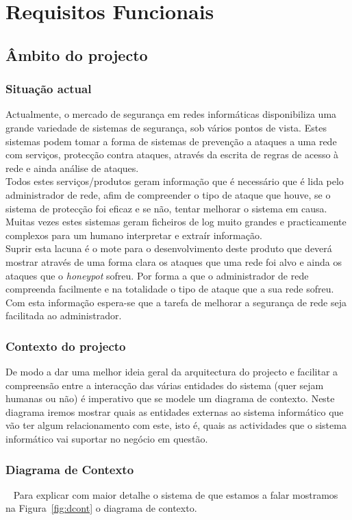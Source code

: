\chapter{Requisitos Funcionais}
\minitoc
\section{Âmbito do projecto}
\subsection{Situação actual}
Actualmente, o mercado de segurança em redes informáticas disponibiliza uma grande variedade de sistemas de segurança, sob vários pontos de vista.
Estes sistemas podem tomar a forma de sistemas de prevenção a ataques a uma rede com serviços, protecção contra ataques, através da
escrita de regras de acesso à rede e ainda análise de ataques.\\
Todos estes serviços/produtos geram informação que é necessário que é lida pelo administrador de rede, afim de compreender o tipo de ataque que houve,
se o sistema de protecção foi eficaz e se não, tentar melhorar o sistema em causa.\\
Muitas vezes estes sistemas geram ficheiros de log muito grandes e practicamente complexos para um humano interpretar e extraír informação.\\
Suprir esta lacuna é o mote para o desenvolvimento deste produto que deverá mostrar através de uma forma clara os ataques que uma rede foi alvo
e ainda os ataques que o \emph{honeypot} sofreu. Por forma a que o administrador de rede compreenda facilmente e na totalidade o tipo de ataque que a sua rede sofreu.
Com esta informação espera-se que a tarefa de melhorar a segurança de rede seja facilitada ao administrador.

\subsection{Contexto do projecto}
De modo a dar uma melhor ideia geral da arquitectura do projecto e facilitar a compreensão entre 
a interacção das várias entidades do sistema (quer sejam humanas ou não) é imperativo que se modele um diagrama de contexto.
Neste diagrama iremos mostrar quais as entidades externas ao sistema informático que vão ter algum relacionamento com este, 
isto é, quais as actividades que o sistema informático vai suportar no negócio em questão. 

\subsection{Diagrama de Contexto}~\label{sec: olare}
Para explicar com maior detalhe o sistema de que estamos a falar mostramos na Figura~\ref{fig:dcont} o diagrama de contexto.

